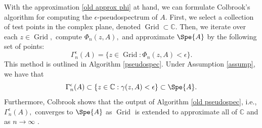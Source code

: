 



With the approximation \eqref{old approx phi} at hand, we can formulate Colbrook's algorithm for computing the $\epsilon$-pseudospectrum of $A.$ First, we select a collection of test points in the complex plane, denoted $\operatorname{Grid} \subset \mathbb{C}.$ Then, we iterate over each $z \in \operatorname{Grid},$ compute
$\Phi_n(z, A),$ and approximate $\Spe{A}$ by the following set of points:
\begin{equation}
    \Gamma_n^{\epsilon}( A)  = \{ z \in \operatorname{Grid} : \Phi_n(z, A) < \epsilon\}.
\end{equation}
This method is outlined in Algorithm \ref{pseudospec}. 
Under Assumption \ref{assump}, we have that
\begin{equation}
    \Gamma_n^{\epsilon}(A) \subset \{z \in \mathbb{C} : \gamma(z, A) < \epsilon\} \subset \Spe{A}.
\end{equation}
Furthermore, Colbrook shows that the output of Algorithm \ref{old pseudospec}, i.e., $\Gamma_n^{\epsilon}(A),$ converges to $\Spe{A}$ as $\operatorname{Grid}$ is extended to approximate all of $\mathbb{C}$ and as  $n \rightarrow \infty$ \cite{Matt}. 





